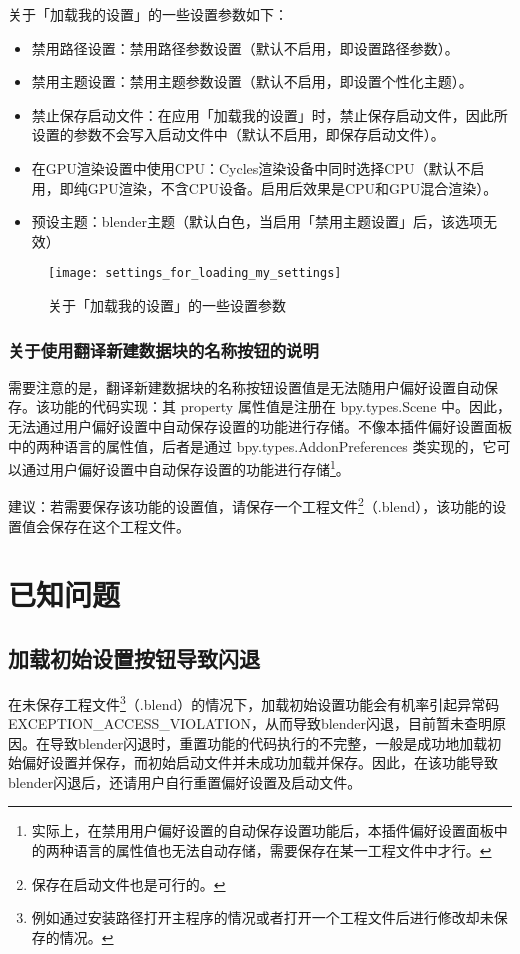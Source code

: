 \documentclass{../../public_resources/doc}
\begin{document}
关于「加载我的设置」的一些设置参数如下：
\hypertarget{加载我的设置小节}{}
\begin{itemize}
    \item 禁用路径设置：禁用路径参数设置（默认不启用，即设置路径参数）。
    \item 禁用主题设置：禁用主题参数设置（默认不启用，即设置个性化主题）。
    \item 禁止保存启动文件：在应用「加载我的设置」时，禁止保存启动文件，因此所设置的参数不会写入启动文件中（默认不启用，即保存启动文件）。
    \item 在GPU渲染设置中使用CPU：Cycles渲染设备中同时选择CPU（默认不启用，即纯GPU渲染，不含CPU设备。启用后效果是CPU和GPU混合渲染）。
    \item 预设主题：blender主题（默认白色，当启用「禁用主题设置」后，该选项无效）
\end{itemize}

\begin{figure}[h!]
    \texttt{[image: settings\_for\_loading\_my\_settings]}
    \caption{关于「加载我的设置」的一些设置参数}
    \label{加载我的设置的设置参数}
\end{figure}

\subsubsection{关于使用翻译新建数据块的名称按钮的说明}
需要注意的是，翻译新建数据块的名称按钮设置值是无法随用户偏好设置自动保存。该功能的代码实现：其 property 属性值是注册在 bpy.types.Scene 中。因此，无法通过用户偏好设置中自动保存设置的功能进行存储。不像本插件偏好设置面板中的两种语言的属性值，后者是通过 bpy.types.AddonPreferences 类实现的，它可以通过用户偏好设置中自动保存设置的功能进行存储\footnote{实际上，在禁用用户偏好设置的自动保存设置功能后，本插件偏好设置面板中的两种语言的属性值也无法自动存储，需要保存在某一工程文件中才行。}。

建议：若需要保存该功能的设置值，请保存一个工程文件\footnote{保存在启动文件也是可行的。}（.blend），该功能的设置值会保存在这个工程文件。

\section{已知问题}
\subsection{加载初始设置按钮导致闪退}
在未保存工程文件\footnote{例如通过安装路径打开主程序的情况或者打开一个工程文件后进行修改却未保存的情况。}（.blend）的情况下，加载初始设置功能会有机率引起异常码EXCEPTION\_ACCESS\_VIOLATION，从而导致blender闪退，目前暂未查明原因。在导致blender闪退时，重置功能的代码执行的不完整，一般是成功地加载初始偏好设置并保存，而初始启动文件并未成功加载并保存。因此，在该功能导致blender闪退后，还请用户自行重置偏好设置及启动文件。
\end{document}
